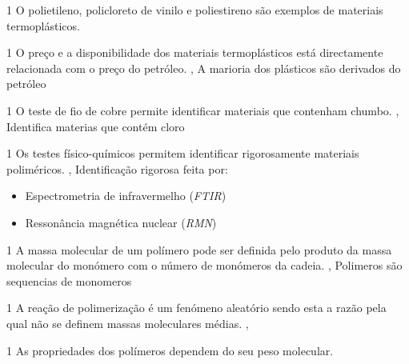 \documentclass[\mainfilename]{subfiles}
\begin{document}
\begin{questionBox}1{ %
    O polietileno, policloreto de vinilo e poliestireno são exemplos de materiais termoplásticos.
} %
    \answer{}
    \AT{}
\end{questionBox}
\begin{questionBox}1{ %
    O preço e a disponibilidade dos materiais termoplásticos está directamente relacionada com o preço do petróleo. 
} %
    \answer{}
    \AT{}, A marioria dos plásticos são derivados do petróleo
\end{questionBox}
\begin{questionBox}1{ %
    O teste de fio de cobre permite identificar materiais que contenham chumbo.
} %
    \answer{}
    \AF{}, Identifica materias que contém cloro
\end{questionBox}
\begin{questionBox}1{ %
    Os testes físico-químicos permitem identificar rigorosamente materiais poliméricos. 
} %
    \answer{}
    \AF{}, Identificação rigorosa feita por:
    \begin{itemize}
        \item Espectrometria de infravermelho (\emph{FTIR})
        \item Ressonância magnética nuclear (\emph{RMN})
    \end{itemize}
\end{questionBox}
\begin{questionBox}1{ %
    A massa molecular de um polímero pode ser definida pelo produto da massa molecular do monómero com o número de monómeros da cadeia.
} %
    \answer{}
    \AT{}, Polimeros são sequencias de monomeros
\end{questionBox}
\begin{questionBox}1{ %
    A reação de polimerização é um fenómeno aleatório sendo esta a razão pela qual não se definem massas moleculares médias.
} %
    \answer{}
    \AF{},
\end{questionBox}
\begin{questionBox}1{ %
    As propriedades dos polímeros dependem do seu peso molecular. 
} %
    \answer{}
    \AT{}
\end{questionBox}
\end{document}
